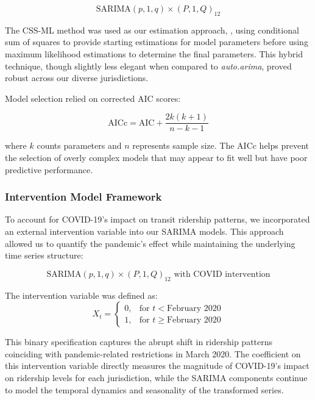 \documentclass[11pt]{article}
\begin{document}
\begin{equation}
\text{SARIMA}(p,1,q) \times (P,1,Q)_{12}
\end{equation}

    The CSS-ML  method  was used as our estimation approach, , using conditional sum of squares to provide starting estimations for model parameters before using maximum likelihood estimations to determine the final parameters. This hybrid technique, though slightly less elegant when compared to \textit{auto.arima}, proved robust across our diverse jurisdictions. 

    Model selection relied on corrected AIC scores:

\begin{equation}
\text{AICc} = \text{AIC} + \frac{2k(k+1)}{n-k-1}
\end{equation}

where $k$ counts parameters and $n$ represents sample size. The AICc helps prevent the selection of overly complex models that may appear to fit well but have poor predictive performance.

\subsubsection{Intervention Model Framework}

    To account for COVID-19's impact on transit ridership patterns, we incorporated an external intervention variable into our SARIMA models. This approach allowed us to quantify the pandemic's effect while maintaining the underlying time series structure:

\begin{equation}
\text{SARIMA}(p,1,q) \times (P,1,Q)_{12} \text{ with COVID intervention}
\end{equation}

The intervention variable was defined as:
\begin{equation}
X_t = \begin{cases}
0, & \text{for } t < \text{February 2020} \\
1, & \text{for } t \geq \text{February 2020}
\end{cases}
\end{equation}

    This binary specification captures the abrupt shift in ridership patterns coinciding with pandemic-related restrictions in March 2020. The coefficient on this intervention variable directly measures the magnitude of COVID-19's impact on ridership levels for each jurisdiction, while the SARIMA components continue to model the temporal dynamics and seasonality of the transformed series.
\end{document}

